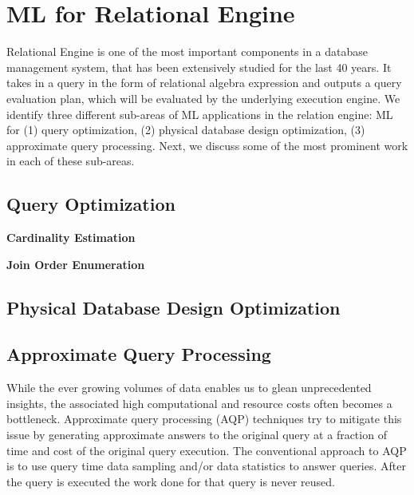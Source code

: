 \section{ML for Relational Engine}
Relational Engine is one of the most important components in a database management system,  that has been extensively studied for the last 40 years.
It takes in a query in the form of relational algebra expression and outputs a query evaluation plan, which will be evaluated by the underlying execution engine.
We identify three different sub-areas of ML applications in the relation engine: ML for (1) query optimization, (2) physical database design optimization, (3) approximate query processing.
Next, we discuss some of the most prominent work in each of these sub-areas.

\subsection{Query Optimization}

\noindent\textbf{Cardinality Estimation}

\noindent\textbf{Join Order Enumeration}

\subsection{Physical Database Design Optimization}


\subsection{Approximate Query Processing}
While the ever growing volumes of data enables us to glean unprecedented insights, the associated high computational and resource costs often becomes a bottleneck.
Approximate query processing (AQP) techniques try to mitigate this issue by generating approximate answers to the original query at a fraction of time and cost of the original query execution.
The conventional approach to AQP is to use query time data sampling and/or data statistics to answer queries.
After the query is executed the work done for that query is never reused.

